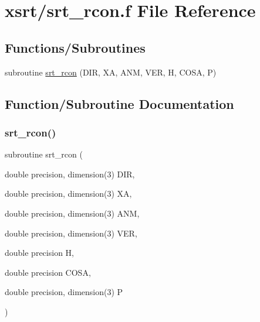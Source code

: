 \hypertarget{srt__rcon_8f}{}\section{xsrt/srt\+\_\+rcon.f File Reference}
\label{srt__rcon_8f}
\subsection*{Functions/\+Subroutines}
\begin{DoxyCompactItemize}
\item 
subroutine \hyperlink{srt__rcon_8f_ab16d15fe6d80a9a109dc5d1d59dc5d99}{srt\+\_\+rcon} (D\+IR, XA, A\+NM, V\+ER, H, C\+O\+SA, P)
\end{DoxyCompactItemize}


\subsection{Function/\+Subroutine Documentation}
\mbox{\label{srt__rcon_8f_ab16d15fe6d80a9a109dc5d1d59dc5d99}} 
\subsubsection{\texorpdfstring{srt\+\_\+rcon()}{srt\_rcon()}}
{\footnotesize\ttfamily subroutine srt\+\_\+rcon (\begin{DoxyParamCaption}\item[{double precision, dimension(3)}]{D\+IR,  }\item[{double precision, dimension(3)}]{XA,  }\item[{double precision, dimension(3)}]{A\+NM,  }\item[{double precision, dimension(3)}]{V\+ER,  }\item[{double precision}]{H,  }\item[{double precision}]{C\+O\+SA,  }\item[{double precision, dimension(3)}]{P }\end{DoxyParamCaption})}

